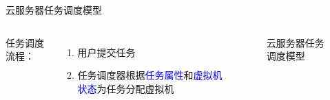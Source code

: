 \begin{frame}{云服务器任务调度模型}

    \begin{columns}

        任务调度流程：
        \begin{enumerate}
            \item 用户提交任务
            \item 任务调度器根据\textcolor{blue}{任务属性}和\textcolor{blue}{虚拟机状态}为任务分配虚拟机
        \end{enumerate}


        \begin{figure}
            \centering
            
            \caption{云服务器任务调度模型}
        \end{figure}

    \end{columns}

\end{frame}
